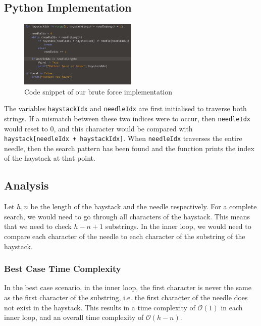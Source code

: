 \subsection*{Python Implementation}

\begin{figure}[h!]
    \centering
    \includegraphics[width=0.50\textwidth]{images/brute_force.png}
    \caption{Code snippet of our brute force implementation}
    \label{fig:bf_code}
\end{figure}

\noindent
The variables \texttt{haystackIdx} and \texttt{needleIdx} are first initialised to traverse both strings. If a mismatch between these two indices were to occur, then \texttt{needleIdx} would reset to 0, and this character would be compared with \texttt{haystack[needleIdx + haystackIdx]}. When \texttt{needleIdx} traverses the entire needle, then the search pattern has been found and the function prints the index of the haystack at that point.

\subsection*{Analysis}
Let $h, n$ be the length of the haystack and the needle respectively. For a complete search, we would need to go through all characters of the haystack. This means that we need to check $h - n + 1$ substrings. In the inner loop, we would need to compare each character of the needle to each character of the substring of the haystack.

\subsubsection*{Best Case Time Complexity}
In the best case scenario, in the inner loop, the first character is never the same as the first character of the substring, i.e. the first character of the needle does not exist in the haystack. This results in a time complexity of $\mathcal{O}(1)$ in each inner loop, and an overall time complexity of $\mathcal{O}(h-n)$.
 
